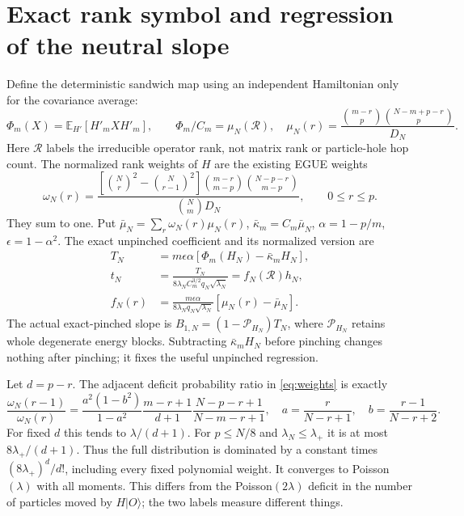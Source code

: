\documentclass[11pt]{article}
\newcommand{\E}{\mathbb E}
\begin{document}
\newpage
\section{Exact rank symbol and regression of the neutral slope}
Define the deterministic sandwich map using an independent Hamiltonian
only for the covariance average:
\begin{equation}
 \Phi_m(X)=\E_{H'}[H'_m XH'_m],\qquad
 \Phi_m/C_m=\mu_N(\mathcal R),
 \quad
 \mu_N(r)=\frac{\binom{m-r}p\binom{N-m+p-r}p}{D_N}.
\end{equation}
Here $\mathcal R$ labels the irreducible operator rank, not matrix
rank or particle-hole hop count. The normalized rank weights of $H$
are the existing EGUE weights
\begin{equation}\label{eq:weights}
 \omega_N(r)=
 \frac{[\binom Nr^2-\binom N{r-1}^2]
       \binom{m-r}{m-p}\binom{N-p-r}{m-p}}
      {\binom Nm D_N},\qquad 0\le r\le p.
\end{equation}
They sum to one. Put $\bar\mu_N=\sum_r\omega_N(r)\mu_N(r)$,
$\bar\kappa_m=C_m\bar\mu_N$, $\alpha=1-p/m$, $\epsilon=1-\alpha^2$.
The exact unpinched coefficient and its normalized version are
\begin{align}
 T_N&=m\epsilon\alpha[\Phi_m(H_N)-\bar\kappa_mH_N],\\
 t_N&=\frac{T_N}{8\lambda_N C_m^{3/2}q_N\sqrt{\lambda_N}}
      =f_N(\mathcal R)h_N,\label{eq:t}\\
 f_N(r)&=\frac{m\epsilon\alpha}{8\lambda_Nq_N\sqrt{\lambda_N}}
                   [\mu_N(r)-\bar\mu_N].
\end{align}
The actual exact-pinched slope is $B_{1,N}=(1-\mathcal P_{H_N})T_N$,
where $\mathcal P_{H_N}$ retains whole degenerate energy blocks.
Subtracting $\bar\kappa_m H_N$ before pinching changes nothing after
pinching; it fixes the useful unpinched regression.

Let $d=p-r$. The adjacent deficit probability ratio in
\eqref{eq:weights} is exactly
\begin{equation}
 \frac{\omega_N(r-1)}{\omega_N(r)}=
 \frac{a^2(1-b^2)}{1-a^2}
 \frac{m-r+1}{d+1}\frac{N-p-r+1}{N-m-r+1},\quad
 a=\frac r{N-r+1},\quad b=\frac{r-1}{N-r+2}.
\end{equation}
For fixed $d$ this tends to $\lambda/(d+1)$. For $p\le N/8$ and
$\lambda_N\le\lambda_+$ it is at most $8\lambda_+/(d+1)$.
Thus the full distribution is dominated by a constant times
$(8\lambda_+)^d/d!$, including every fixed polynomial weight. It
converges to Poisson$(\lambda)$ with all moments. This differs from
the Poisson$(2\lambda)$ deficit in the number of particles moved
by $H|O\rangle$; the two labels measure different things.
\end{document}

